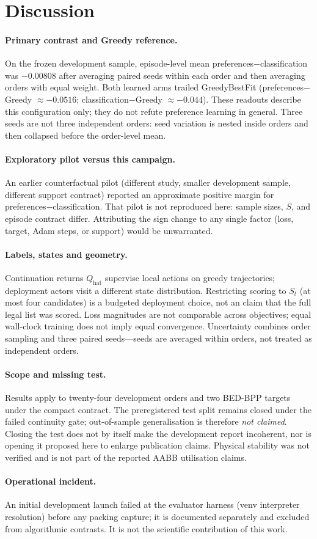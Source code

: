 \section{Discussion}

\paragraph{Primary contrast and Greedy reference.}
On the frozen development sample, episode-level mean
preferences$-$classification was $-0.00808$ after averaging paired seeds within
each order and then averaging orders with equal weight.
Both learned arms trailed GreedyBestFit (preferences$-$Greedy $\approx -0.0516$;
classification$-$Greedy $\approx -0.044$). These readouts describe this
configuration only; they do not refute preference learning in general.
Three seeds are not three independent orders: seed variation is nested inside
orders and then collapsed before the order-level mean.

\paragraph{Exploratory pilot versus this campaign.}
An earlier counterfactual pilot (different study, smaller development
sample, different support contract) reported an approximate positive
margin for preferences$-$classification. That pilot is not reproduced
here: sample sizes, $S$, and episode contract differ. Attributing the
sign change to any single factor (loss, target, Adam steps, or support)
would be unwarranted.

\paragraph{Labels, states and geometry.}
Continuation returns $Q_{\mathrm{hat}}$ supervise local actions on greedy
trajectories; deployment actors visit a different state distribution. Restricting
scoring to $S_t$ (at most four candidates) is a budgeted deployment choice, not
an claim that the full legal list was scored. Loss magnitudes are not comparable
across objectives; equal wall-clock training does not imply equal convergence.
Uncertainty combines order sampling and three paired seeds---seeds are averaged
within orders, not treated as independent orders.

\paragraph{Scope and missing test.}
Results apply to twenty-four development orders and two BED-BPP targets under the
compact contract. The preregistered test split remains closed under the failed
continuity gate; out-of-sample generalisation is therefore \emph{not claimed}.
Closing the test does not by itself make the development report incoherent, nor
is opening it proposed here to enlarge publication claims. Physical stability
was not verified and is not part of the reported AABB utilisation claims.

\paragraph{Operational incident.}
An initial development launch failed at the evaluator harness (venv interpreter
resolution) before any packing capture; it is documented separately and excluded
from algorithmic contrasts. It is not the scientific contribution of this work.
